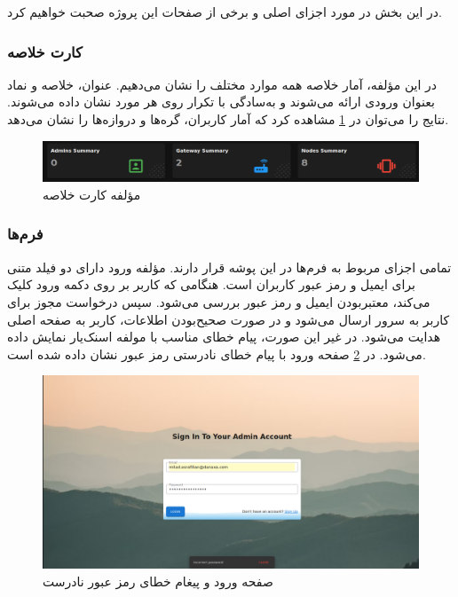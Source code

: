 در این بخش در مورد اجزای اصلی و برخی از صفحات این پروژه صحبت خواهیم کرد.


\subsubsection{کارت خلاصه}

در این مؤلفه، آمار خلاصه همه موارد مختلف را نشان می‌دهیم. عنوان، خلاصه و نماد بعنوان ورودی ارائه می‌شوند و به‌سادگی با تکرار روی هر مورد نشان داده می‌شوند. نتایج را می‌توان در \cref{fig:summary_card} مشاهده کرد که آمار کاربران، گره‌ها و دروازه‌ها را نشان می‌دهد.

\begin{figure}[!h]
\centering\includegraphics[scale=.45]{summary_card.png}
\caption{مؤلفه کارت خلاصه}\label{fig:summary_card}
\end{figure}

\subsubsection{فرم‌ها}

تمامی اجزای مربوط به فرم‌ها در این پوشه قرار دارند. مؤلفه ورود دارای دو فیلد متنی برای ایمیل و رمز عبور کاربران است. هنگامی که کاربر بر روی دکمه ورود کلیک می‌کند، معتبربودن ایمیل و رمز عبور بررسی می‌شود. سپس درخواست مجوز برای کاربر به سرور ارسال می‌شود و در صورت صحیح‌بودن اطلاعات، کاربر به صفحه اصلی هدایت می‌شود. در غیر این صورت، پیام خطای مناسب با مولفه اسنک‌یار نمایش داده می‌شود. در \cref{fig:login_page} صفحه ورود با پیام خطای نادرستی رمز عبور نشان داده شده است.

\begin{figure}[!h]
\centering\includegraphics[scale=.38]{login_page.png}
\caption{صفحه ورود و پیغام خطای رمز عبور نادرست}\label{fig:login_page}
\end{figure}

